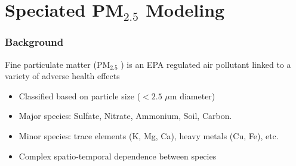 \documentclass[t]{beamer}\usepackage[]{graphicx}\usepackage[]{color}
\newcommand{\PM}{$\text{PM}_{2.5}$ }
\begin{document}

\section{Speciated PM$_{2.5}$ Modeling}


\begin{frame}
\frametitle{Background}
    
Fine particulate matter (\PM{}) is an EPA regulated air pollutant linked to a variety of adverse health effects

\begin{itemize}
  \vspace{2mm} \item Classified based on particle size ($<2.5$ $\mu$m diameter)
  \vspace{2mm} \item Major species: Sulfate, Nitrate, Ammonium, Soil, Carbon.
  \vspace{2mm} \item Minor species: trace elements (K, Mg, Ca), heavy metals (Cu, Fe), etc.
  \vspace{2mm} \item Complex spatio-temporal dependence between species
\end{itemize}


\end{frame}

\end{document}
